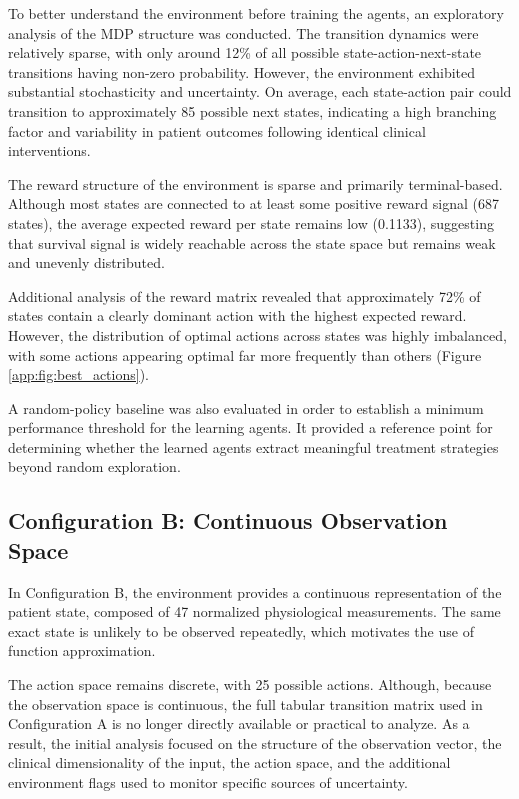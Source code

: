 \documentclass[11pt,a4paper]{article}
\begin{document}
To better understand the environment before training the agents, 
an exploratory analysis of the MDP structure was conducted. 
The transition dynamics were relatively sparse, 
with only around 12\% of all possible state-action-next-state transitions having non-zero probability. 
However, the environment exhibited substantial stochasticity and uncertainty. 
On average, each state-action pair could transition to approximately 85 possible next states, 
indicating a high branching factor and variability in patient outcomes following 
identical clinical interventions.

The reward structure of the environment is sparse and primarily terminal-based.
Although most states are connected to at least some positive reward signal (687 states), 
the average expected reward per state remains low (0.1133), 
suggesting that survival signal is widely reachable across the state space
but remains weak and unevenly distributed.

Additional analysis of the reward matrix revealed that approximately 72\% of states 
contain a clearly dominant action with the highest expected reward.
However, the distribution of optimal actions across states was highly imbalanced, 
with some actions appearing optimal far more frequently than others (Figure \ref{app:fig:best_actions}).

A random-policy baseline was also evaluated in order to establish a minimum performance threshold
for the learning agents. It provided a reference point for determining whether the learned agents
extract meaningful treatment strategies beyond random exploration.


\subsection{Configuration B: Continuous Observation Space}

In Configuration B, the environment provides a continuous representation of the patient state, composed of 47 normalized physiological measurements. 
The same exact state is unlikely to be observed repeatedly, which motivates the use of function approximation. 

The action space remains discrete, with 25 possible actions. Although, because the observation space is continuous, 
the full tabular transition matrix used in Configuration A is no longer directly available or practical to analyze. 
As a result, the initial analysis focused on the structure of the observation vector, the clinical dimensionality of the input, the action space, 
and the additional environment flags used to monitor specific sources of uncertainty. 
\end{document}
